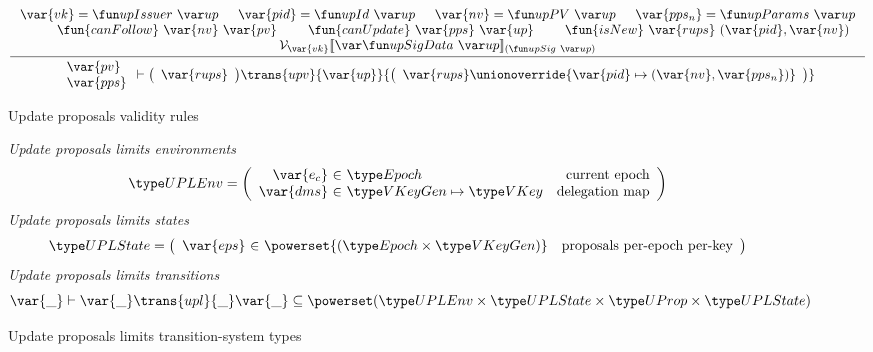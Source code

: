 \begin{figure}[htb]
  \begin{equation}
    \label{eq:rule:up-validity}
    \inference
    {
      \var{vk} = \upIssuer{up}
      & \var{pid} = \upId{up}
      & \var{nv} = \upPV{up}
      & \var{pps_n} = \upParams{up}\\
      & \fun{canFollow}~\var{nv}~\var{pv}
      & \fun{canUpdate}~\var{pps}~\var{up}
      & \fun{isNew}~\var{rups}~(\var{pid}, \var{nv})\\
      \mathcal{V}_{\var{vk}}\serialised{\upSigData{up}}_{(\upSig{up})}
    }
    {
      {
        \begin{array}{l}
          \var{pv}\\
          \var{pps}
        \end{array}
      }
      \vdash
      {
        \left(
          \begin{array}{l}
            \var{rups}
          \end{array}
        \right)
      }
      \trans{upv}{\var{up}}
      {
        \left(
          \begin{array}{l}
            \var{rups} \unionoverride \{ \var{pid} \mapsto (\var{nv}, \var{pps_n}) \}
          \end{array}
        \right)
      }
    }
  \end{equation}
  \caption{Update proposals validity rules}
  \label{fig:rules:up-validity}
\end{figure}

\clearpage

\begin{figure}[htb]
  \emph{Update proposals limits  environments}
    \begin{equation*}
    \UPLEnv =
    \left(
      \begin{array}{r@{~\in~}lr}
        \var{e_c} & \Epoch & \text{current epoch}\\
        \var{dms} & \VKeyGen \mapsto \VKey & \text{delegation map}\\
      \end{array}
    \right)
  \end{equation*}
  \emph{Update proposals limits states}
  \begin{equation*}
    \UPLState
    = \left(
      \begin{array}{r@{~\in~}lr}
        \var{eps} & \powerset{(\Epoch \times \VKeyGen)} & \text{proposals per-epoch per-key}\\
      \end{array}
    \right)
  \end{equation*}
  \emph{Update proposals limits transitions}
  \begin{equation*}
    \var{\_} \vdash
    \var{\_} \trans{upl}{\_} \var{\_}
    \subseteq \powerset (\UPLEnv \times \UPLState \times \UProp \times \UPLState)
  \end{equation*}
  \caption{Update proposals limits transition-system types}
  \label{fig:ts-types:up-limits}
\end{figure}

